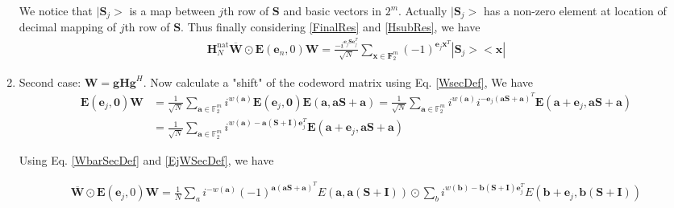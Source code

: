 \documentclass{article}
\begin{document}
\begin{enumerate}
	
	We notice that $|\mathbf{S}_j>$ is a map between $j$th row of $\mathbf{S}$ and basic vectors in $2^m$. Actually $|\mathbf{S}_j>$ has a non-zero element at location of decimal mapping of $j$th row of $\mathbf{S}$. Thus finally considering \eqref{FinalRes} and \eqref{HsubRes}, we have
	\begin{align}
		\mathbf{H}_N^{\text{nat}}\overline{\mathbf{W}} \odot \mathbf{E}(\mathbf{e}_n, 0)\mathbf{W} = \frac{-i^{\mathbf{e}_j \mathbf{S e}_j^T}}{\sqrt{N}} \sum_{ \mathbf{x} \in \mathbf{F}_2^m}{(-1)^{\mathbf{e}_j \mathbf{x}^T} |\mathbf{S}_j><\mathbf{x}| }\label{FinHcalRes}
	\end{align}
	\item Second case: $\mathbf{W=gHg}^H$. Now calculate a "shift" of the codeword matrix using Eq. \ref{WsecDef}, We have
	\begin{align}
		\mathbf{E}(\mathbf{e}_j, \mathbf{0})\mathbf{W} &= \frac{1}{\sqrt{N}} \sum_{\mathbf{a} \in \mathbb{F}^m_2} i^{w(\mathbf{a})}\mathbf{E}(\mathbf{e}_j,\mathbf{0})\mathbf{E}(\mathbf{a},\mathbf{a}\mathbf{S} + \mathbf{a}) = \frac{1}{\sqrt{N}} \sum_{\mathbf{a} \in \mathbb{F}^m_2} i^{w(\mathbf{a})}i^{-\mathbf{e}_j(\mathbf{a}\mathbf{S} + \mathbf{a})^T}\mathbf{E}(\mathbf{a} + \mathbf{e}_j,\mathbf{a}\mathbf{S} + \mathbf{a}) \nonumber \\ 
		&= \frac{1}{\sqrt{N}} \sum_{\mathbf{a} \in \mathbb{F}^m_2} i^{w(\mathbf{a})-\mathbf{a}(\mathbf{S} + \mathbf{I})\mathbf{e}_j^T}\mathbf{E}(\mathbf{a} + \mathbf{e}_j,\mathbf{a}\mathbf{S} + \mathbf{a}) \label{EjWSecDef}
	\end{align}
	
	
	Using Eq. \ref{WbarSecDef} and \ref{EjWSecDef}, we have
	
	\begin{align*}
		\overline{\mathbf{W}} \odot \mathbf{E}(\mathbf{e}_j, 0)\mathbf{W} = \frac{1}{N} \sum_a i^{-w(\mathbf{a})}(-1)^{\mathbf{a}(\mathbf{a}\mathbf{S} + \mathbf{a})^T} E(\mathbf{a}, \mathbf{a}(\mathbf{S} + \mathbf{I})) \odot \sum_b i^{w(\mathbf{b}) - \mathbf{b}(\mathbf{S} + \mathbf{I})\mathbf{e}_j^T} E(\mathbf{b} + \mathbf{e}_j, \mathbf{b}(\mathbf{S} + \mathbf{I}))
	\end{align*}
	

\end{enumerate}
\end{document}
